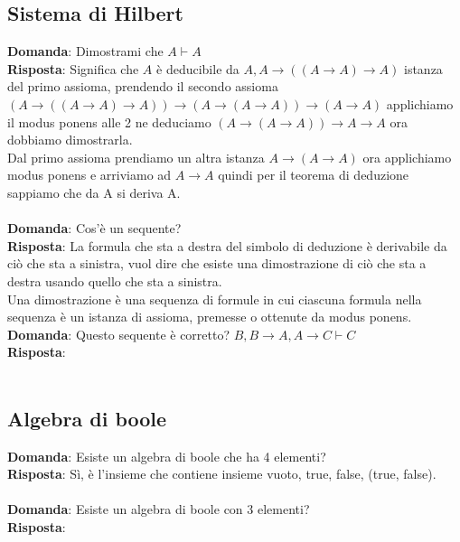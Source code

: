 \documentclass{article}
\begin{document}
\subsection{Sistema di Hilbert}
\textbf{Domanda}: Dimostrami che $A \vdash A$ \\
\textbf{Risposta}: Significa che $A$ è deducibile da $A, A \rightarrow ((A \rightarrow A) \rightarrow A)$ istanza del primo assioma,
prendendo il secondo assioma $(A \rightarrow ((A \rightarrow A) \rightarrow A)) \rightarrow (A \rightarrow (A \rightarrow A)) \rightarrow (A \rightarrow A)$
applichiamo il modus ponens alle 2 ne deduciamo $(A \rightarrow (A \rightarrow A)) \rightarrow A \rightarrow A$ ora dobbiamo dimostrarla.\\
Dal primo assioma prendiamo un altra istanza $A \rightarrow (A \rightarrow A)$ ora applichiamo modus ponens e arriviamo ad $A \rightarrow A$ quindi per il teorema di deduzione
sappiamo che da A si deriva A. \\ \\
\textbf{Domanda}: Cos'è un sequente? \\
\textbf{Risposta}: La formula che sta a destra del simbolo di deduzione è derivabile da ciò che sta a sinistra, vuol dire che esiste una dimostrazione di ciò che sta a destra usando quello che sta a sinistra. \\
Una dimostrazione è una sequenza di formule in cui ciascuna formula nella sequenza è un istanza di assioma, premesse o ottenute da modus ponens.
\textbf{Domanda}: Questo sequente è corretto? $B, B \rightarrow A, A \rightarrow C \vdash C$ \\
\textbf{Risposta}: \\ \\


\subsection{Algebra di boole}
\textbf{Domanda}: Esiste un algebra di boole che ha 4 elementi? \\
\textbf{Risposta}: Sì, è l'insieme che contiene insieme vuoto, true, false, (true, false). \\ \\
\textbf{Domanda}: Esiste un algebra di boole con 3 elementi? \\
\textbf{Risposta}: \\ \\
\end{document}
